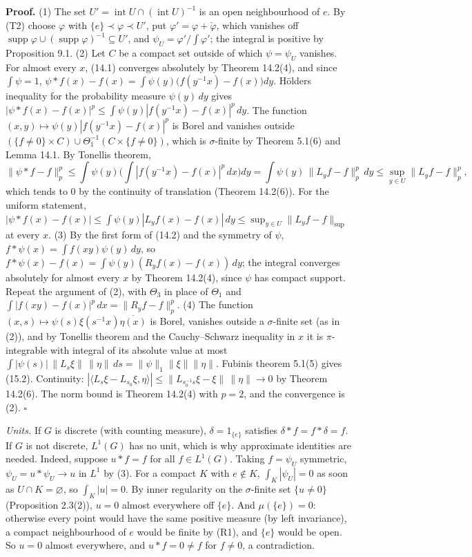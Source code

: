 \documentclass[
  english,
  11pt,
  a4paper,
]{article}
\begin{document}
\textbf{Proof.} (1) The set
\(U'=\operatorname{int}U\cap(\operatorname{int}U)^{-1}\) is an open
neighbourhood of \(e\). By (T2) choose \(\varphi\) with
\(\{e\}\prec\varphi\prec U'\), put \(\varphi'=\varphi+\check\varphi\),
which vanishes off
\(\operatorname{supp}\varphi\cup(\operatorname{supp}\varphi)^{-1}\subseteq U'\),
and \(\psi_U=\varphi'/\int\varphi'\); the integral is positive by
Proposition 9.1. (2) Let \(C\) be a compact set outside of which
\(\psi=\psi_U\) vanishes. For almost every \(x\), (14.1) converges
absolutely by Theorem 14.2(4), and since \(\int\psi=1\),
\(\psi*f(x)-f(x)=\int\psi(y)\big(f(y^{-1}x)-f(x)\big)dy\).
Hölder\textquotesingle s inequality for the probability measure
\(\psi(y)\,dy\) gives
\(|\psi*f(x)-f(x)|^p\leq\int\psi(y)|f(y^{-1}x)-f(x)|^p\,dy\). The
function \((x,y)\mapsto\psi(y)|f(y^{-1}x)-f(x)|^p\) is Borel and
vanishes outside
\((\{f\neq0\}\times C)\cup\Theta_1^{-1}(C\times\{f\neq0\})\), which is
\(\sigma\)-finite by Theorem 5.1(6) and Lemma 14.1. By
Tonelli\textquotesingle s theorem,
\[\|\psi*f-f\|_p^p\leq\int\psi(y)\Big(\int|f(y^{-1}x)-f(x)|^p\,dx\Big)dy=\int\psi(y)\,\|L_yf-f\|_p^p\,dy\leq\sup_{y\in U}\|L_yf-f\|_p^p ,\]
which tends to \(0\) by the continuity of translation (Theorem 14.2(6)).
For the uniform statement,
\(|\psi*f(x)-f(x)|\leq\int\psi(y)|L_yf(x)-f(x)|\,dy\leq\sup_{y\in U}\|L_yf-f\|_{\sup}\)
at every \(x\). (3) By the first form of (14.2) and the symmetry of
\(\psi\), \(f*\psi(x)=\int f(xy)\psi(y)\,dy\), so
\(f*\psi(x)-f(x)=\int\psi(y)(R_yf(x)-f(x))\,dy\); the integral converges
absolutely for almost every \(x\) by Theorem 14.2(4), since \(\psi\) has
compact support. Repeat the argument of (2), with \(\Theta_3\) in place
of \(\Theta_1\) and \(\int|f(xy)-f(x)|^p\,dx=\|R_yf-f\|_p^p\). (4) The
function \((x,s)\mapsto\psi(s)\xi(s^{-1}x)\overline{\eta(x)}\) is Borel,
vanishes outside a \(\sigma\)-finite set (as in (2)), and by
Tonelli\textquotesingle s theorem and the Cauchy--Schwarz inequality in
\(x\) it is \(\pi\)-integrable with integral of its absolute value at
most
\(\int|\psi(s)|\,\|L_s\xi\|\,\|\eta\|\,ds=\|\psi\|_1\|\xi\|\|\eta\|\).
Fubini\textquotesingle s theorem 5.1(5) gives (15.2). Continuity:
\(|\langle L_s\xi-L_{s_0}\xi,\eta\rangle|\leq\|L_{s_0^{-1}s}\xi-\xi\|\,\|\eta\|\to0\)
by Theorem 14.2(6). The norm bound is Theorem 14.2(4) with \(p=2\), and
the convergence is (2). \(\square\)

\emph{Units.} If \(G\) is discrete (with counting measure),
\(\delta=1_{\{e\}}\) satisfies \(\delta*f=f*\delta=f\). If \(G\) is not
discrete, \(L^1(G)\) has no unit, which is why approximate identities
are needed. Indeed, suppose \(u*f=f\) for all \(f\in L^1(G)\). Taking
\(f=\psi_U\) symmetric, \(\psi_U=u*\psi_U\to u\) in \(L^1\) by (3). For
a compact \(K\) with \(e\notin K\), \(\int_K|\psi_U|=0\) as soon as
\(U\cap K=\varnothing\), so \(\int_K|u|=0\). By inner regularity on the
\(\sigma\)-finite set \(\{u\neq0\}\) (Proposition 2.3(2)), \(u=0\)
almost everywhere off \(\{e\}\). And \(\mu(\{e\})=0\): otherwise every
point would have the same positive measure (by left invariance), a
compact neighbourhood of \(e\) would be finite by (R1), and \(\{e\}\)
would be open. So \(u=0\) almost everywhere, and \(u*f=0\neq f\) for
\(f\neq0\), a contradiction.
\end{document}
